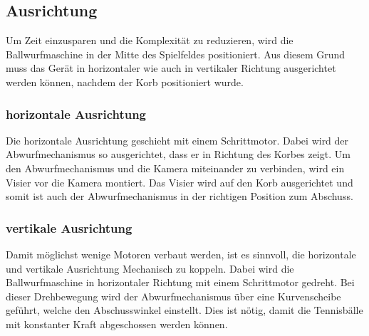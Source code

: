 \subsection{Ausrichtung}
Um Zeit einzusparen und die Komplexität zu reduzieren, wird die Ballwurfmaschine in der Mitte des Spielfeldes positioniert. Aus diesem Grund muss das Gerät in horizontaler wie auch in vertikaler Richtung ausgerichtet werden können, nachdem der Korb positioniert wurde. 

\subsubsection{horizontale Ausrichtung}
Die horizontale Ausrichtung geschieht mit einem Schrittmotor. Dabei wird der Abwurfmechanismus so ausgerichtet, dass er in Richtung des Korbes zeigt. Um den Abwurfmechanismus und die Kamera miteinander zu verbinden, wird ein Visier vor die Kamera montiert. Das Visier wird auf den Korb ausgerichtet und somit ist auch der Abwurfmechanismus in der richtigen Position zum Abschuss.

\subsubsection{vertikale Ausrichtung}
Damit möglichst wenige Motoren verbaut werden, ist es sinnvoll, die horizontale und vertikale Ausrichtung Mechanisch zu koppeln. Dabei wird die Ballwurfmaschine in horizontaler Richtung mit einem Schrittmotor gedreht. Bei dieser Drehbewegung wird der Abwurfmechanismus über eine Kurvenscheibe geführt, welche den Abschusswinkel einstellt. Dies ist nötig, damit die Tennisbälle mit konstanter Kraft abgeschossen werden können.